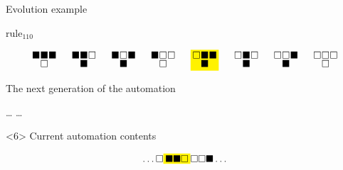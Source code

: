 \documentclass[presentation,aspectratio=169,smaller]{beamer}
\begin{document}
\begin{frame}[label={sec:org3545853},t]{Evolution example}
\begin{onlyenv}
\(\text{rule}_{110}\)

\begin{equation*}
  \begingroup
  \setlength\arraycolsep{0.25pt}
  \renewcommand{\arraystretch}{0.5}
  \begin{matrix}
    \blacksquare & \blacksquare & \blacksquare \\
    & \square &
  \end{matrix}\mspace{28mu}
  \begin{matrix}
    \blacksquare & \blacksquare & \square \\
    & \blacksquare &
  \end{matrix}\mspace{28mu}
  \begin{matrix}
    \blacksquare & \square & \blacksquare \\
    & \blacksquare &
  \end{matrix}\mspace{28mu}
  \begin{matrix}
    \blacksquare & \square & \square \\
    & \square &
  \end{matrix}\mspace{28mu}
  \mathcolorbox{yellow}{
    \begin{matrix}
      \square & \blacksquare & \blacksquare \\
      & \blacksquare &
    \end{matrix}
  }\mspace{28mu}
  \begin{matrix}
    \square & \blacksquare & \square \\
    & \blacksquare &
  \end{matrix}\mspace{28mu}
  \begin{matrix}
    \square & \square & \blacksquare \\
    & \blacksquare &
  \end{matrix}\mspace{28mu}
  \begin{matrix}
    \square & \square & \square \\
    & \square &
  \end{matrix}
  \endgroup
\end{equation*}

The next generation of the automation

\hfill \dots
\blacksquare
{}
\mspace{14mu}
\mspace{14mu}
\mspace{14mu}
\mspace{14mu}
\mspace{14mu}
\dots \hfill
\end{onlyenv}

\begin{onlyenv}<6>
Current automation contents

\begin{equation*}
  \hfill
  \dots
  \square
  \mathcolorbox{yellow}{
    \blacksquare
    \blacksquare
    \square
  }
  \square
  \square
  \blacksquare
  \dots
  \hfill
\end{equation*}


\end{onlyenv}
\end{frame}
\end{document}
